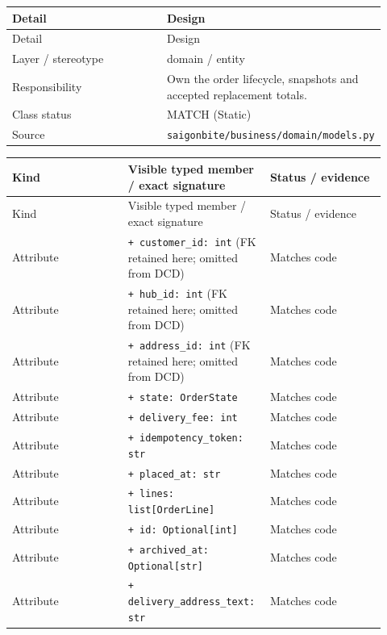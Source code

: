 \begin{longtable}{>{\raggedright\arraybackslash}p{0.4600\linewidth}>{\raggedright\arraybackslash}p{0.4600\linewidth}}
Detail & Design \\
\hline\endfirsthead
Detail & Design \\
\hline\endhead
Layer / stereotype & domain / \guillemotleft{}entity\guillemotright{} \\
Responsibility & Own the order lifecycle, snapshots and accepted replacement totals. \\
Class status & MATCH (Static) \\
Source & \texttt{saigonbite/\allowbreak{}business/\allowbreak{}domain/\allowbreak{}models.\allowbreak{}py} \\
\end{longtable}
\begin{longtable}{>{\raggedright\arraybackslash}p{0.3067\linewidth}>{\raggedright\arraybackslash}p{0.3067\linewidth}>{\raggedright\arraybackslash}p{0.3067\linewidth}}
Kind & Visible typed member / exact signature & Status / evidence \\
\hline\endfirsthead
Kind & Visible typed member / exact signature & Status / evidence \\
\hline\endhead
Attribute & \texttt{+ customer\_\allowbreak{}id: int} (FK retained here; omitted from DCD) & Matches code \\
Attribute & \texttt{+ hub\_\allowbreak{}id: int} (FK retained here; omitted from DCD) & Matches code \\
Attribute & \texttt{+ address\_\allowbreak{}id: int} (FK retained here; omitted from DCD) & Matches code \\
Attribute & \texttt{+ state: OrderState} & Matches code \\
Attribute & \texttt{+ delivery\_\allowbreak{}fee: int} & Matches code \\
Attribute & \texttt{+ idempotency\_\allowbreak{}token: str} & Matches code \\
Attribute & \texttt{+ placed\_\allowbreak{}at: str} & Matches code \\
Attribute & \texttt{+ lines: list[OrderLine]} & Matches code \\
Attribute & \texttt{+ id: Optional[int]} & Matches code \\
Attribute & \texttt{+ archived\_\allowbreak{}at: Optional[str]} & Matches code \\
Attribute & \texttt{+ delivery\_\allowbreak{}address\_\allowbreak{}text: str} & Matches code \\

\end{longtable}
